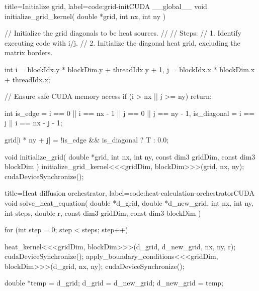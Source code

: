 \documentclass[../main.tex]{subfiles}
\begin{document}
\begin{code}{title=Initialize grid, label=code:grid-init}{CUDA}
__global__ 
void initialize_grid_kernel(
    double *grid, 
    int nx, 
    int ny
)
{
    // Initialize the grid diagonals to be heat sources.
    // 
    // Steps:
    //  1. Identify executing code with i/j.
    //  2. Initialize the diagonal heat grid, excluding the matrix borders.
    
    int i = blockIdx.y * blockDim.y + threadIdx.y + 1,
        j = blockIdx.x * blockDim.x + threadIdx.x;

    // Ensure safe CUDA memory access
    if (i > nx || j >= ny) return;

    int is_edge     = i == 0 || i == nx - 1 || j == 0 || j == ny - 1, 
        is_diagonal = i == j || i == nx - j - 1;

    grid[i * ny + j] = !is_edge && is_diagonal ? T : 0.0;
}

void initialize_grid(
    double *grid,
    int nx,
    int ny,
    const dim3 gridDim,
    const dim3 blockDim
)
{
    initialize_grid_kernel<<<gridDim, blockDim>>>(grid, nx, ny);
    cudaDeviceSynchronize();
}
\end{code}

\begin{code}{title=Heat diffusion orchestrator, label=code:heat-calculation-orchestrator}{CUDA}
void solve_heat_equation(
    double *d_grid, 
    double *d_new_grid, 
    int nx,
    int ny,
    int steps,
    double r,
    const dim3 gridDim,
    const dim3 blockDim
)
{
    for (int step = 0; step < steps; step++)
    {
        heat_kernel<<<gridDim, blockDim>>>(d_grid, d_new_grid, nx, ny, r);
        cudaDeviceSynchronize();
        apply_boundary_conditions<<<gridDim, blockDim>>>(d_grid, nx, ny);
        cudaDeviceSynchronize();

        double *temp = d_grid;
        d_grid = d_new_grid;
        d_new_grid = temp;
    } 
}
\end{code}
\end{document}
